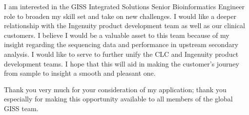 \documentclass[10pt,letterpaper,sigleft]{newlfm}
\begin{document}
\begin{newlfm}
I am interested in the GISS Integrated Solutions Senior Bioinformatics Engineer role to broaden my skill set and take on new challenges. I would like a deeper relationship with the Ingenuity product development team as well as our clinical customers. I believe I would be a valuable asset to this team because of my insight regarding the sequencing data and performance in upstream secondary analysis. I would like to serve to further unify the CLC and Ingenuity product development teams. I hope that this will aid in making the customer's journey from sample to insight a smooth and pleasant one.

Thank you very much for your consideration of my application; thank you especially for making this opportunity available to all members of the global GISS team.
 

\end{newlfm}
\end{document}
